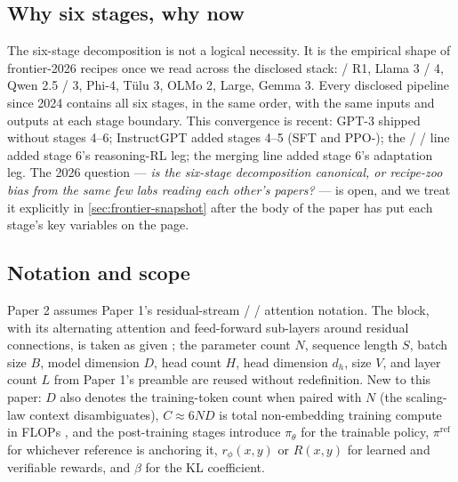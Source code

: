 \subsection{Why six stages, why now}
\label{sec:intro-six}

The six-stage decomposition is not a logical necessity. It is the
empirical shape of frontier-2026 recipes once we read across the
disclosed stack:  / R1, Llama 3 / 4, Qwen 2.5 / 3, Phi-4,
T\"ulu 3, OLMo 2,  Large, Gemma 3. Every disclosed pipeline
since 2024 contains all six stages, in the same order, with the same
inputs and outputs at each stage boundary. This convergence is recent:
GPT-3 \citep{brown2020} shipped without stages 4--6; InstructGPT
\citep{ouyang2022-instructgpt} added stages 4--5 (SFT and PPO-);
the  /  /  line \citep{shao2024,deepseek-r1,dapo2025} added
stage 6's reasoning-RL leg; the merging line
\citep{wortsman2022-model-soups,ilharco2022-task-vectors,yadav2023-ties-merging}
added stage 6's adaptation leg. The 2026 question --- \emph{is the
six-stage decomposition canonical, or recipe-zoo bias from the same few
labs reading each other's papers?} --- is open, and we treat it
explicitly in \cref{sec:frontier-snapshot} after the body of the paper
has put each stage's key variables on the page.

\subsection{Notation and scope}
\label{sec:intro-notation}

Paper 2 assumes Paper 1's residual-stream /  / attention notation.
The  block, with its alternating attention and feed-forward
sub-layers around residual connections, is taken as given
\citep{vaswani2017}; the parameter count $N$, sequence length $S$,
batch size $B$, model dimension $D$, head count $H$, head dimension
$d_h$,  size $V$, and layer count $L$ from Paper 1's
preamble are reused without redefinition. New to this paper: $D$ also
denotes the training-token count when paired with $N$ (the scaling-law
context disambiguates), $C \approx 6ND$ is total non-embedding training
compute in FLOPs \citep[\S 2.1]{kaplan2020}, and the post-training
stages introduce $\pi_\theta$ for the trainable policy,
$\pi^{\mathrm{ref}}$ for whichever reference is anchoring it,
$r_\phi(x,y)$ or $R(x,y)$ for learned and verifiable rewards, and
$\beta$ for the KL coefficient.

